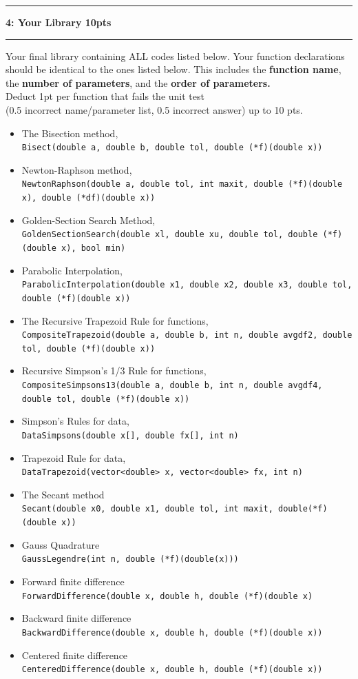 \documentclass[11pt]{article}
\newcommand\question[2]{\vspace{.25in}\hrule\textbf{#1: #2}\vspace{.5em}\hrule\vspace{.10in}}
\begin{document}
\newpage
\question{4}{Your Library \color{red} 10pts}
Your final library containing ALL codes listed below. Your function declarations should be identical to the ones listed below. This includes the \textbf{function name}, the \textbf{number of parameters}, and the\textbf{ order of parameters.} \\
\color{red}Deduct 1pt per function that fails the unit test \\(0.5 incorrect name/parameter list, 0.5 incorrect answer) up to 10 pts. \color{black}
\begin{itemize}
	\item The Bisection method, \\\texttt{Bisect(double a, double b, double tol, double (*f)(double x))}
	\item Newton-Raphson method, \\\texttt{NewtonRaphson(double a, double tol, int maxit, double (*f)(double x), double (*df)(double x))}
	\item Golden-Section Search Method, \\\texttt{GoldenSectionSearch(double xl, double xu, double tol, double (*f)(double x), bool min)}
	\item Parabolic Interpolation, \\\texttt{ParabolicInterpolation(double x1, double x2, double x3, double tol, double (*f)(double x))}
	\item The Recursive Trapezoid Rule for functions, \\\texttt{CompositeTrapezoid(double a, double b, int n, double avgdf2, double tol, double (*f)(double x))}
	\item Recursive Simpson's 1/3 Rule for functions, \\\texttt{CompositeSimpsons13(double a, double b, int n, double avgdf4, double tol, double (*f)(double x))}
	\item Simpson's Rules for data, \\\texttt{DataSimpsons(double x[], double fx[], int n)}
	\item Trapezoid Rule for data, \\\texttt{DataTrapezoid(vector<double> x, vector<double> fx, int n)}
	\item The Secant method \\\texttt{Secant(double x0, double x1, double tol, int maxit, double(*f)(double x))}
	\item Gauss Quadrature \\\texttt{GaussLegendre(int n, double (*f)(double(x)))}
	\item Forward finite difference \\\texttt{ForwardDifference(double x, double h, double (*f)(double x)}
\end{itemize}
\newpage
\begin{itemize}
	\item Backward finite difference \\\texttt{BackwardDifference(double x, double h, double (*f)(double x))}
	\item Centered finite difference \\\texttt{CenteredDifference(double x, double h, double (*f)(double x))}
\end{itemize}
\end{document}
